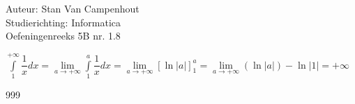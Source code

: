 \documentclass[a4paper]{article}
\begin{document}
  
\noindent \large Auteur: Stan Van Campenhout \\
\noindent \large Studierichting:  Informatica\\
\noindent \large Oefeningenreeks 5B nr. 1.8\\

\medskip

\normalsize

$ \displaystyle\int\limits_1^{+\infty}\dfrac{1}{x} dx = \lim\limits_{a\rightarrow+\infty}\displaystyle\int\limits_1^a\dfrac{1}{x}dx
= \lim\limits_{a\rightarrow+\infty}\left[\ln\left|a\right|\right]_1^a = \lim\limits_{a\rightarrow+\infty}\left(\ln|a|\right) - \ln|1| = +\infty  $\\

\begin{thebibliography}{999}
\end{thebibliography}
\end{document}

